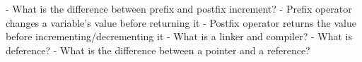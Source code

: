 - What is the difference between prefix and postfix increment?
	- Prefix operator changes a variable's value before returning it
	- Postfix operator returns the value before incrementing/decrementing it
- What is a linker and compiler?
- What is deference?
- What is the difference between a pointer and a reference?
